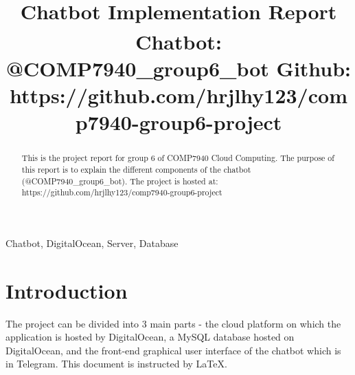 \documentclass[conference]{IEEEtran}
\begin{document}
\title{Chatbot Implementation Report\\
{\footnotesize \textsuperscript{}Chatbot: @COMP7940\_group6\_bot Github: https://github.com/hrjlhy123/comp7940-group6-project}
}

\author{
\and
{}
\and
{}
}

\maketitle

\begin{abstract}
This is the project report for group 6 of COMP7940 Cloud Computing. The purpose of this report is to explain the different components of the chatbot (@COMP7940\_group6\_bot). The project is hosted at: https://github.com/hrjlhy123/comp7940-group6-project
\end{abstract}

\begin{IEEEkeywords}
Chatbot, DigitalOcean, Server, Database
\end{IEEEkeywords}

\section{Introduction}
The project can be divided into 3 main parts - the cloud platform on which the application is hosted by DigitalOcean, a MySQL database hosted on DigitalOcean, and the front-end graphical user interface of the chatbot which is in Telegram. This document is instructed by \LaTeX. 
\end{document}
